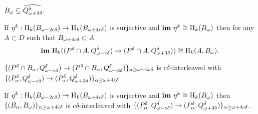 \begin{lemma}
  $\B\subseteq \widehat{\QQ^\of}$.
\end{lemma}

\begin{corollary}
  If $\eta^k : \hom_k(\b)\to \hom_k(\BB)$ is surjective and $\im~\eta^k\cong \hom_k(\B)$ then for any $A\subset D$ such that $\BB\subset A$
  \[ \im~\hom_k((\P\cap A, \Q^\delta)\to (\P\cap A, \QQ^\delta))\cong \hom_k(A, \B). \]
\end{corollary}

\begin{lemma}
  $\{(\P\cap B_\alpha, \Q^\delta)\to (\P\cap B_\alpha, \QQ^\delta)\}_{\alpha\geq\oo}$ is $c\delta$-interleaved with $\{(P_\alpha^\delta, \Q^\delta)\to (P_\alpha^\delta, \QQ^\delta)\}_{\alpha\geq\oo}$.
\end{lemma}

\begin{corollary}
  If $\eta^k : \hom_k(\b)\to \hom_k(\BB)$ is surjective and $\im~\eta^k\cong \hom_k(\B)$ then $\{(B_\alpha, \B)\}_{\alpha\geq\oo}$ is $c\delta$-interleaved with $\{(P_\alpha^\delta, \Q^\delta)\to (P_\alpha^\delta, \QQ^\delta)\}_{\alpha\geq\oo}$.
\end{corollary}
